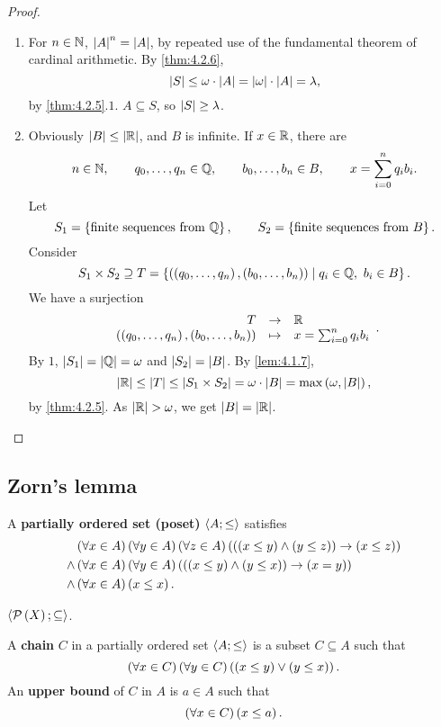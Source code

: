\begin{proof}
\hfill
\begin{enumerate}
\item For $ n \in \N $, $ \abs{A}^n = \abs{A} $, by repeated use of the fundamental theorem of cardinal arithmetic. By \ref{thm:4.2.6},
$$ \abs{S} \le \omega \cdot \abs{A} = \abs{\omega} \cdot \abs{A} = \lambda, $$
by \ref{thm:4.2.5}.$ 1 $. $ A \subseteq S $, so $ \abs{S} \ge \lambda $.
\item Obviously $ \abs{B} \le \abs{\R} $, and $ B $ is infinite. If $ x \in \R $, there are
$$ n \in \N, \qquad q_0, \dots, q_n \in \Q, \qquad b_0, \dots, b_n \in B, \qquad x = \sum_{i = 0}^n q_ib_i. $$
Let
$$ S_1 = \cb{\text{finite sequences from} \ \Q}, \qquad S_2 = \cb{\text{finite sequences from} \ B}. $$
Consider
$$ S_1 \times S_2 \supseteq T = \cb{\rb{\rb{q_0, \dots, q_n}, \rb{b_0, \dots, b_n}} \mid q_i \in \Q, \ b_i \in B}. $$
We have a surjection
$$ \function{T}{\R}{\rb{\rb{q_0, \dots, q_n}, \rb{b_0, \dots, b_n}}}{x = \sum_{i = 0}^n q_ib_i}. $$
By $ 1 $, $ \abs{S_1} = \abs{\Q} = \omega $ and $ \abs{S_2} = \abs{B} $. By \ref{lem:4.1.7},
$$ \abs{\R} \le \abs{T} \le \abs{S_1 \times S_2} = \omega \cdot \abs{B} = \max\rb{\omega, \abs{B}}, $$
by \ref{thm:4.2.5}. As $ \abs{\R} > \omega $, we get $ \abs{B} = \abs{\R} $.
\end{enumerate}
\end{proof}

\pagebreak

\subsection{Zorn's lemma}


A \textbf{partially ordered set (poset)} $ \ab{A; \le} $ satisfies
\begin{align*}
& \fab{x \in A}\fab{y \in A}\fab{z \in A}\impb{\andb{\leb{x}{y}}{\leb{y}{z}}}{\leb{x}{z}} \\
\land & \fab{x \in A}\fab{y \in A}\impb{\andb{\leb{x}{y}}{\leb{y}{x}}}{\eqb{x}{y}} \\
\land & \fab{x \in A}\leb{x}{x}.
\end{align*}

\begin{example*}
$ \ab{\PP\rb{X}; \subseteq} $.
\end{example*}

A \textbf{chain} $ C $ in a partially ordered set $ \ab{A; \le} $ is a subset $ C \subseteq A $ such that
$$ \fab{x \in C}\fab{y \in C}\orb{\leb{x}{y}}{\leb{y}{x}}. $$
An \textbf{upper bound} of $ C $ in $ A $ is $ a \in A $ such that
$$ \fab{x \in C}\leb{x}{a}. $$

